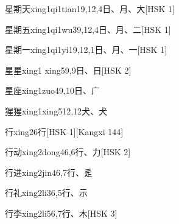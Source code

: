 \begin{entry}{星期天}{xing1qi1tian1}{9,12,4}{⽇、⽉、⼤}[HSK 1]
\end{entry}

\begin{entry}{星期五}{xing1qi1wu3}{9,12,4}{⽇、⽉、⼆}[HSK 1]
\end{entry}

\begin{entry}{星期一}{xing1qi1yi1}{9,12,1}{⽇、⽉、⼀}[HSK 1]
\end{entry}

\begin{entry}{星星}{xing1 xing5}{9,9}{⽇、⽇}[HSK 2]
\end{entry}

\begin{entry}{星座}{xing1zuo4}{9,10}{⽇、⼴}
\end{entry}

\begin{entry}{猩猩}{xing1xing5}{12,12}{⽝、⽝}
\end{entry}

\begin{entry}{行}{xing2}{6}{⾏}[HSK 1][Kangxi 144]
\end{entry}

\begin{entry}{行动}{xing2dong4}{6,6}{⾏、⼒}[HSK 2]
\end{entry}

\begin{entry}{行进}{xing2jin4}{6,7}{⾏、⾡}
\end{entry}

\begin{entry}{行礼}{xing2li3}{6,5}{⾏、⽰}
\end{entry}

\begin{entry}{行李}{xing2li5}{6,7}{⾏、⽊}[HSK 3]
\end{entry}

